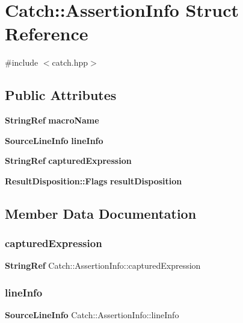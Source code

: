 \section{Catch\+::Assertion\+Info Struct Reference}
\label{struct_catch_1_1_assertion_info}


{\ttfamily \#include $<$catch.\+hpp$>$}

\subsection*{Public Attributes}
\begin{DoxyCompactItemize}
\item 
\textbf{ String\+Ref} \textbf{ macro\+Name}
\item 
\textbf{ Source\+Line\+Info} \textbf{ line\+Info}
\item 
\textbf{ String\+Ref} \textbf{ captured\+Expression}
\item 
\textbf{ Result\+Disposition\+::\+Flags} \textbf{ result\+Disposition}
\end{DoxyCompactItemize}


\subsection{Member Data Documentation}
\mbox{\label{struct_catch_1_1_assertion_info_accd36744b4acaa3a691a72df0b42190f}} 
\subsubsection{capturedExpression}
{\footnotesize\ttfamily \textbf{ String\+Ref} Catch\+::\+Assertion\+Info\+::captured\+Expression}

\mbox{\label{struct_catch_1_1_assertion_info_a17bdbb404ba12658034f833be2f4c3e7}} 
\subsubsection{lineInfo}
{\footnotesize\ttfamily \textbf{ Source\+Line\+Info} Catch\+::\+Assertion\+Info\+::line\+Info}

\mbox{\label{struct_catch_1_1_assertion_info_aaf3fbb9f1fe09c879ba3d877584e3056}} 
